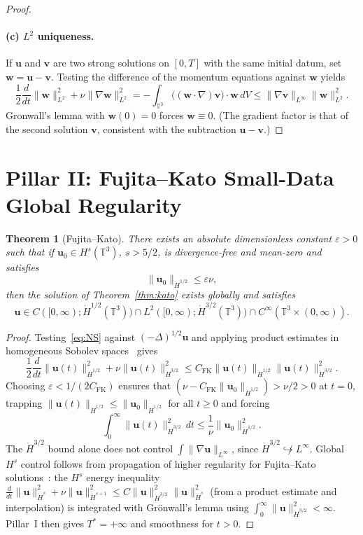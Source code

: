 \documentclass[11pt,a4paper]{article}
\newtheorem{theorem}{Theorem}[section]
\begin{document}
\begin{proof}
\paragraph{(c) \(L^2\) uniqueness.}
If \(\mathbf{u}\) and \(\mathbf{v}\) are two strong solutions on \([0,T]\) with the same initial datum, set \(\mathbf{w}=\mathbf{u}-\mathbf{v}\). Testing the difference of the momentum equations against \(\mathbf{w}\) yields
\[
\frac12\frac{d}{dt}\|\mathbf{w}\|_{L^2}^2+\nu\|\nabla\mathbf{w}\|_{L^2}^2
=-\int_{\mathbb{T}^3}\bigl((\mathbf{w}\cdot\nabla)\mathbf{v}\bigr)\cdot\mathbf{w}\,dV
\le\|\nabla\mathbf{v}\|_{L^\infty}\|\mathbf{w}\|_{L^2}^2.
\]
Gronwall's lemma with \(\mathbf{w}(0)=0\) forces \(\mathbf{w}\equiv 0\). (The gradient factor is that of the second solution \(\mathbf{v}\), consistent with the subtraction \(\mathbf{u}-\mathbf{v}\).)
\end{proof}

\section{Pillar II: Fujita--Kato Small-Data Global Regularity}

\begin{theorem}[Fujita--Kato]\label{thm:fk}
There exists an absolute dimensionless constant \(\varepsilon>0\) such that if \(\mathbf{u}_0\in H^s(\mathbb{T}^3)\), \(s>5/2\), is divergence-free and mean-zero and satisfies
\[
\|\mathbf{u}_0\|_{\dot{H}^{1/2}}\le\varepsilon\nu,
\]
then the solution of Theorem~\ref{thm:kato} exists globally and satisfies
\[
\mathbf{u}\in C([0,\infty);\dot{H}^{1/2}(\mathbb{T}^3))\cap L^2([0,\infty);\dot{H}^{3/2}(\mathbb{T}^3))\cap C^\infty(\mathbb{T}^3\times(0,\infty)).
\]
\end{theorem}

\begin{proof}
Testing~\eqref{eq:NS} against \((-\Delta)^{1/2}\mathbf{u}\) and applying product estimates in homogeneous Sobolev spaces~\cite{FujitaKato1964} gives
\[
\frac12\frac{d}{dt}\|\mathbf{u}(t)\|_{\dot{H}^{1/2}}^2+\nu\|\mathbf{u}(t)\|_{\dot{H}^{3/2}}^2\le C_{\mathrm{FK}}\|\mathbf{u}(t)\|_{\dot{H}^{1/2}}\|\mathbf{u}(t)\|_{\dot{H}^{3/2}}^2.
\]
Choosing \(\varepsilon<1/(2C_{\mathrm{FK}})\) ensures that \((\nu-C_{\mathrm{FK}}\|\mathbf{u}_0\|_{\dot{H}^{1/2}})>\nu/2>0\) at \(t=0\), trapping \(\|\mathbf{u}(t)\|_{\dot{H}^{1/2}}\le\|\mathbf{u}_0\|_{\dot{H}^{1/2}}\) for all \(t\ge 0\) and forcing
\[
\int_0^\infty\|\mathbf{u}(t)\|_{\dot{H}^{3/2}}^2\,dt\le\frac1\nu\|\mathbf{u}_0\|_{\dot{H}^{1/2}}^2.
\]
The \(\dot H^{3/2}\) bound alone does not control \(\int\|\nabla\mathbf{u}\|_{L^\infty}\), since \(\dot H^{3/2}\not\hookrightarrow L^\infty\). Global \(H^s\) control follows from propagation of higher regularity for Fujita--Kato solutions~\cite{FujitaKato1964}: the \(H^s\) energy inequality \(\frac{d}{dt}\|\mathbf u\|_{\dot H^s}^2+\nu\|\mathbf u\|_{\dot H^{s+1}}^2\le C\|\mathbf u\|_{\dot H^{3/2}}^2\|\mathbf u\|_{\dot H^s}^2\) (from a product estimate and interpolation) is integrated with Gr\"onwall's lemma using \(\int_0^\infty\|\mathbf u\|_{\dot H^{3/2}}^2<\infty\). Pillar~I then gives \(T^*=+\infty\) and smoothness for \(t>0\).
\end{proof}
\end{document}
